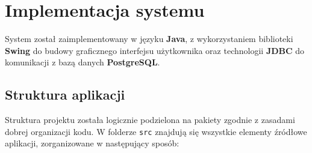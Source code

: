 \chapter{Implementacja systemu}

System został zaimplementowany w języku \textbf{Java}, z wykorzystaniem biblioteki \textbf{Swing} do budowy graficznego interfejsu użytkownika oraz technologii \textbf{JDBC} do komunikacji z bazą danych \textbf{PostgreSQL}.

\section{Struktura aplikacji}

Struktura projektu została logicznie podzielona na pakiety zgodnie z zasadami dobrej organizacji kodu. W folderze \texttt{src} znajdują się wszystkie elementy źródłowe aplikacji, zorganizowane w następujący sposób:

